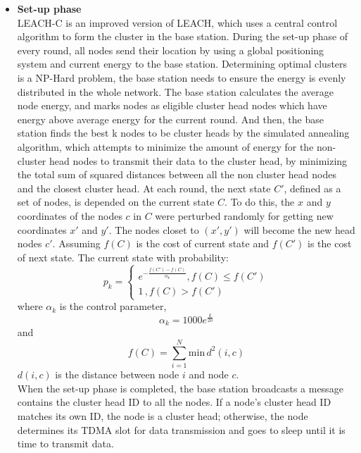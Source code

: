 \documentclass[11pt]{report}
\begin{document}
	\begin{itemize}
		\item \textbf{Set-up phase}\\
		LEACH-C\cite{1045297} is an improved version of LEACH, which uses a central control algorithm to form the cluster in the base station. During the set-up phase of every round, all nodes send their location by using a global positioning system and current energy to the base station. Determining optimal clusters is a NP-Hard problem, the base station needs to ensure the energy is evenly distributed in the whole network. The base station calculates the average node energy, and marks nodes as eligible cluster head nodes which have energy above average energy for the current round.  And then, \cite{104529777}the base station finds the best k nodes to be cluster heads by the simulated annealing algorithm, which attempts to minimize the amount of energy for the non-cluster head nodes to transmit their data to the cluster head, by minimizing the total sum of squared distances between all the non cluster head nodes and the closest cluster head. At each round, the next state $C'$, defined as a set of nodes, is depended on the current state $C$. To do this, the $x$ and $y$ coordinates of the nodes $c$ in $C$ were perturbed randomly for getting new  coordinates $x'$ and $y'$. The nodes closet to $(x',y')$ will become the new head nodes $c'$. Assuming $f(C)$ is the cost of current state and $f(C')$ is the cost of next state. The current state with probability: 
		\begin{equation}
		p_k = \left\{ \begin{array}{ll}
		e^{-\frac{f(C')-f(C)}{\alpha_k}},f(C) \leq f(C')\\
		1         \,                      ,f(C) > f(C')
		\end{array} \right.
		\end{equation}
		where $\alpha_k$ is the control parameter, 
		\begin{equation}
		\alpha_k = 1000e^{\frac{k}{20}}
		\end{equation}
		and
		\begin{equation}
		f(C) = \sum_{i=1}^{N}\text{min}\,d^2(i,c)
		\end{equation}
		$d(i,c)$ is the distance between node $i$ and node $c$.\\
		When the set-up phase is completed, the base station broadcasts a message contains the cluster head ID to all the nodes. If a node’s cluster head ID matches its own ID, the node is a cluster head; otherwise, the node determines its TDMA slot for data transmission and goes to sleep until it is time to transmit data.
	\end{itemize}
	
\end{document}
